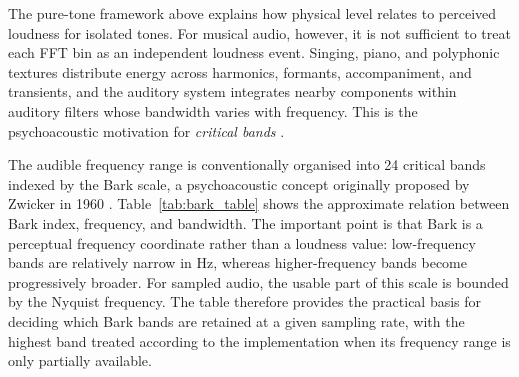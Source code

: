 The pure-tone framework above explains how physical level relates to perceived loudness for isolated tones. For musical audio, however, it is not sufficient to treat each FFT bin as an independent loudness event. Singing, piano, and polyphonic textures distribute energy across harmonics, formants, accompaniment, and transients, and the auditory system integrates nearby components within auditory filters whose bandwidth varies with frequency. This is the psychoacoustic motivation for \emph{critical bands} \cite{zwicker1999psychoacoustics}.

The audible frequency range is conventionally organised into 24 critical bands indexed by the Bark scale, a psychoacoustic concept originally proposed by Zwicker in 1960 \cite{zwicker1960unterteilung}. Table~\ref{tab:bark_table} shows the approximate relation between Bark index, frequency, and bandwidth. The important point is that Bark is a perceptual frequency coordinate rather than a loudness value: low-frequency bands are relatively narrow in Hz, whereas higher-frequency bands become progressively broader. For sampled audio, the usable part of this scale is bounded by the Nyquist frequency. The table therefore provides the practical basis for deciding which Bark bands are retained at a given sampling rate, with the highest band treated according to the implementation when its frequency range is only partially available. 

